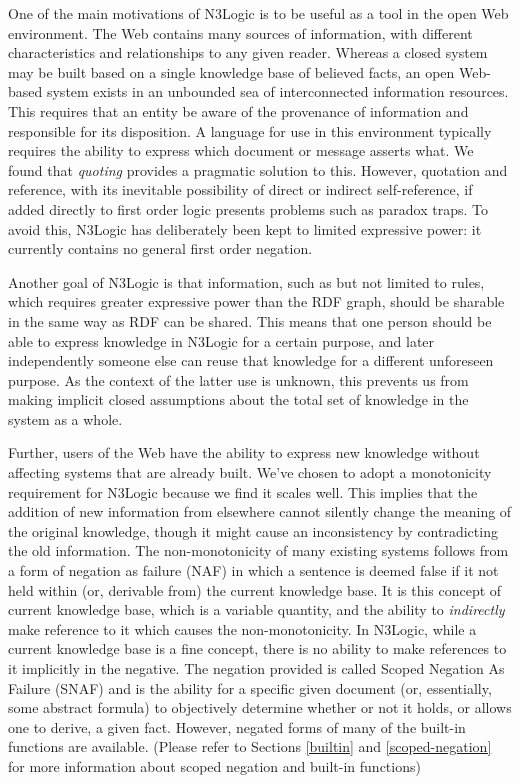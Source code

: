 \documentclass{tlp}
\begin{document}
One of the main motivations of N3Logic is to be useful as a tool in
the open Web environment. The Web contains many sources of
information, with different characteristics and relationships to any
given reader.  Whereas a closed system may be built based on a single
knowledge base of believed facts, an open Web-based system exists in
an unbounded sea of interconnected information resources. This
requires that an entity be aware of the provenance of information and
responsible for its disposition.  A language for use in this
environment typically requires the ability to express which document
or message asserts what. We found that {\it quoting} provides a
pragmatic solution to this.  However, quotation and reference, with its inevitable
possibility of direct or indirect self-reference, if added directly to
first order logic presents problems such as paradox traps. To avoid
this, N3Logic has deliberately been kept to limited expressive power:
it currently contains no general first order negation.

Another goal of N3Logic is that information, such as but not limited
to rules, which requires greater expressive power than the RDF graph,
should be sharable in the same way as RDF can be shared.  This means
that one person should be able to express knowledge in N3Logic for a
certain purpose, and later independently someone else can reuse that
knowledge for a different unforeseen purpose.  As the context of the
latter use is unknown, this prevents us from making implicit closed
assumptions about the total set of knowledge in the system as a whole.

Further, users of the Web have the ability to express new knowledge
without affecting systems that are already built.  We've chosen to
adopt a monotonicity requirement for N3Logic because we find it scales
well. This implies that the addition of new information from elsewhere
cannot silently change the meaning of the original knowledge, though
it might cause an inconsistency by contradicting the old information.
The non-monotonicity of many existing systems follows from a form of
negation as failure (NAF) in which a sentence is deemed false if it
not held within (or, derivable from) the current knowledge base.  It
is this concept of current knowledge base, which is a variable
quantity, and the ability to {\it indirectly} make reference to it
which causes the non-monotonicity.  In N3Logic, while a current
knowledge base is a fine concept, there is no ability to make
references to it implicitly in the negative.  The negation provided is
called Scoped Negation As Failure (SNAF) and is the ability for a
specific given document (or, essentially, some abstract formula) to
objectively determine whether or not it holds, or allows one to
derive, a given fact.  However, negated forms of many of the built-in
functions are available. (Please refer to Sections \ref{builtin} and
\ref{scoped-negation} for more information about scoped negation and
built-in functions)
\end{document}
